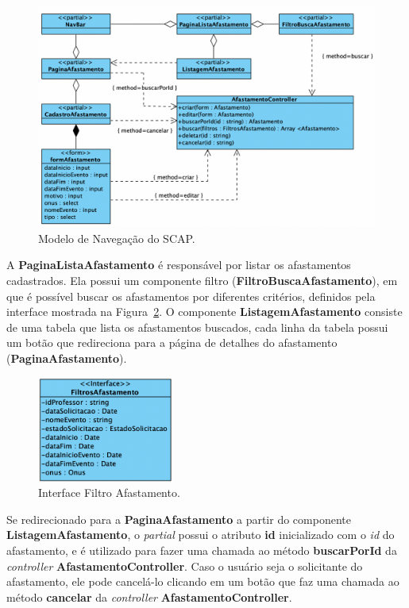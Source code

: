 \begin{figure}
    \centering
    \includegraphics[width=1\textwidth]{figuras/fig-modelo-naveg-afast.png}
    \caption{Modelo de Navegação do SCAP.}
    \label{fig-modelo-navegacao-afast}
\end{figure}

A \textbf{PaginaListaAfastamento} é responsável por listar os afastamentos cadastrados.
Ela possui um componente filtro (\textbf{FiltroBuscaAfastamento}), em que é possível buscar
os afastamentos por diferentes critérios, definidos pela interface mostrada na Figura~\ref{fig-interface-filtro-afast}.
O componente \textbf{ListagemAfastamento} consiste de uma tabela que lista os afastamentos buscados,
cada linha da tabela possui um botão que redireciona para a página de detalhes do afastamento (\textbf{PaginaAfastamento}).

\begin{figure}
    \centering
    \includegraphics[width=0.4\textwidth]{figuras/fig-interface-filtro-afast.png}
    \caption{Interface Filtro Afastamento.}
    \label{fig-interface-filtro-afast}
\end{figure}

Se redirecionado para a \textbf{PaginaAfastamento} a partir do componente \textbf{ListagemAfastamento},
o \textit{partial} possui o atributo \textbf{id} inicializado com o \textit{id} do afastamento, e é
utilizado para fazer uma chamada ao método \textbf{buscarPorId} da \textit{controller} \textbf{AfastamentoController}.
Caso o usuário seja o solicitante do afastamento, ele pode cancelá-lo clicando em um botão que faz uma chamada ao método
\textbf{cancelar} da \textit{controller} \textbf{AfastamentoController}.

